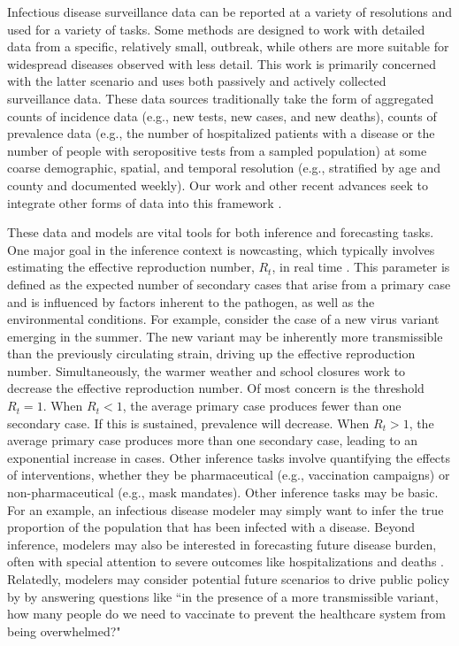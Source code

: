 Infectious disease surveillance data can be reported at a variety of resolutions and used for a variety of tasks.
Some methods are designed to work with detailed data from a specific, relatively small, outbreak, while others are more suitable for widespread diseases observed with less detail.
This work is primarily concerned with the latter scenario and uses both passively and actively collected surveillance data.
These data sources traditionally take the form of aggregated counts of incidence data (e.g., new tests, new cases, and new deaths), counts of prevalence data (e.g., the number of hospitalized patients with a disease or the number of people with seropositive tests from a sampled population) at some coarse demographic, spatial, and temporal resolution (e.g., stratified by age and county and documented weekly).
Our work and other recent advances seek to integrate other forms of data into this framework \citep{Rasmussen2011, Tang2022}.

These data and models are vital tools for both inference and forecasting tasks.
One major goal in the inference context is nowcasting, which typically involves estimating the effective reproduction number, \( R_t \), in real time \citep{10.1093/aje/kwt133}.
This parameter is defined as the expected number of secondary cases that arise from a primary case and is influenced by factors inherent to the pathogen, as well as the environmental conditions.
For example, consider the case of a new virus variant emerging in the summer.
The new variant may be inherently more transmissible than the previously circulating strain, driving up the effective reproduction number.
Simultaneously, the warmer weather and school closures work to decrease the effective reproduction number.
Of most concern is the threshold \( R_t = 1 \).
When \( R_t < 1 \), the average primary case produces fewer than one secondary case.
If this is sustained, prevalence will decrease.
When \( R_t > 1 \), the average primary case produces more than one secondary case, leading to an exponential increase in cases.
Other inference tasks involve quantifying the effects of interventions, whether they be pharmaceutical (e.g., vaccination campaigns) or non-pharmaceutical (e.g., mask mandates).
Other inference tasks may be basic.
For an example, an infectious disease modeler may simply want to infer the true proportion of the population that has been infected with a disease.
Beyond inference, modelers may also be interested in forecasting future disease burden, often with special attention to severe outcomes like hospitalizations and deaths \citep{10.1371/journal.pmed.1003793}.
Relatedly, modelers may consider potential future scenarios to drive public policy by  by answering questions like ``in the presence of a more transmissible variant, how many people do we need to vaccinate to prevent the healthcare system from being overwhelmed?"

